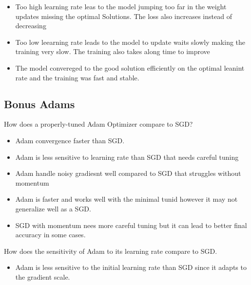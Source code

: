 \documentclass{article}
\begin{document}
\begin{enumerate}[label=\alph*)]
\begin{enumerate}[label=\alph*)]
\begin{itemize}
            \item Too high learning rate leas to the model jumping too far in the weight updates missing the optimal Solutions. The loss also increases instead of decreasing
            \item Too low leearning rate leads to the model to update waits slowly making the training very slow. The training also takes along time to improve
            \item The model convereged to the good solution efficiently on the optimal leanint rate and the training was fast and stable.
         \end{itemize}
   \end{enumerate}

   \subsection*{Bonus Adams}
   How does a properly-tuned Adam Optimizer compare to SGD?
   \begin{itemize}
      \item Adam convergence faster than SGD.
      \item Adam is less sensitive to learning rate than SGD that needs careful tuning
      \item Adam handle noisy gradiesnt well compared to SGD that struggles without momentum
      \item Adam is faster and works well with the minimal tunid however it may not generalize well as a SGD.
      \item SGD with momentum nees more careful tuning but it can lead to better final accuracy in some cases.
   \end{itemize}
   How does the sensitivity of Adam to its learning rate compare to SGD.
   \begin{itemize}
      \item Adam is less sensitive to the initial learning rate than SGD since it adapts to the gradient scale. 
   \end{itemize}

\end{enumerate}
\end{document}
